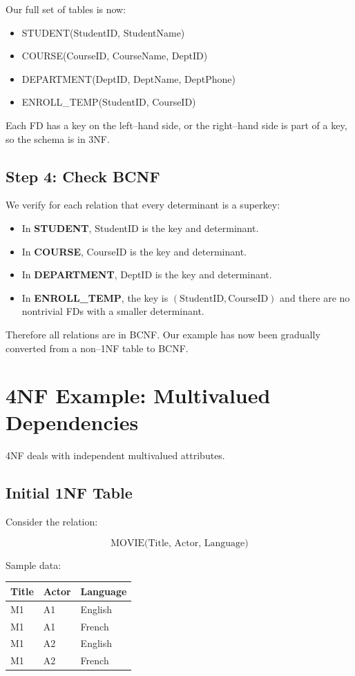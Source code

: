 \documentclass{article}
\begin{document}
Our full set of tables is now:
\begin{itemize}
  \item STUDENT(StudentID, StudentName)
  \item COURSE(CourseID, CourseName, DeptID)
  \item DEPARTMENT(DeptID, DeptName, DeptPhone)
  \item ENROLL\_TEMP(StudentID, CourseID)
\end{itemize}

Each FD has a key on the left--hand side, or the right--hand side is
part of a key, so the schema is in 3NF.

\subsection*{Step 4: Check BCNF}

We verify for each relation that every determinant is a superkey:
\begin{itemize}
  \item In \textbf{STUDENT}, StudentID is the key and determinant.
  \item In \textbf{COURSE}, CourseID is the key and determinant.
  \item In \textbf{DEPARTMENT}, DeptID is the key and determinant.
  \item In \textbf{ENROLL\_TEMP}, the key is
        $(\text{StudentID},\text{CourseID})$
        and there are no nontrivial FDs with a smaller determinant.
\end{itemize}

Therefore all relations are in BCNF. Our example has now been gradually
converted from a non--1NF table to BCNF.

\clearpage
\section*{4NF Example: Multivalued Dependencies}

4NF deals with independent multivalued attributes.

\subsection*{Initial 1NF Table}

Consider the relation:

\[
\text{MOVIE(Title, Actor, Language)}
\]

Sample data:

\begin{center}
\begin{tabular}{lll}
\toprule
Title & Actor & Language \\
\midrule
M1 & A1 & English \\
M1 & A1 & French \\
M1 & A2 & English \\
M1 & A2 & French \\
\bottomrule
\end{tabular}
\end{center}
\end{document}
